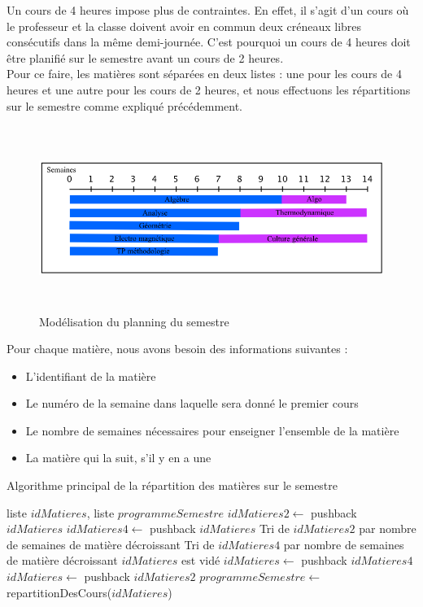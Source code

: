 Un cours de 4 heures impose plus de contraintes. En effet, il s'agit d'un cours où le professeur et la classe doivent avoir en commun deux créneaux libres consécutifs dans la même demi-journée. C'est pourquoi un cours de 4 heures doit être planifié sur le semestre avant un cours de 2 heures.\\

Pour ce faire, les matières sont séparées en deux listes : une pour les cours de 4 heures et une autre pour les cours de 2 heures, et nous effectuons les répartitions sur le semestre comme expliqué précédemment.\\

\begin{figure}[! ht ]
    \centering
    \begin{minipage}[t]{14 cm}
        \centering
            \includegraphics [width=160mm, height=60mm]{RepartitionSemestre.png}
        \caption {Modélisation du planning du semestre}
    \end{minipage}
\end{figure}


Pour chaque matière, nous avons besoin des informations suivantes :
\begin{itemize}
\item L'identifiant de la matière
\item Le numéro de la semaine dans laquelle sera donné le premier cours
\item Le nombre de semaines nécessaires pour enseigner l'ensemble de la matière
\item La matière qui la suit, s'il y en a une
\end{itemize}

\begin{algorithm}
\caption{Algorithme principal de la répartition des matières sur le semestre}
\begin{algorithmic}
\REQUIRE liste $idMatieres$, liste $programmeSemestre$
\STATE $idMatieres2 \leftarrow$ pushback $idMatieres$
\ELSE
\STATE $idMatieres4 \leftarrow$ pushback $idMatieres$
\ENDIF
\ENDFOR
\STATE Tri de $idMatieres2$ par nombre de semaines de matière décroissant
\STATE Tri de $idMatieres4$ par nombre de semaines de matière décroissant
\STATE $idMatieres$ est vidé
\STATE $idMatieres \leftarrow$ pushback $idMatieres4$
\ENDFOR
{}
\STATE $idMatieres \leftarrow$ pushback $idMatieres2$
\ENDFOR
\RETURN $programmeSemestre \leftarrow$ repartitionDesCours($idMatieres$)
\end{algorithmic}
\end{algorithm}

